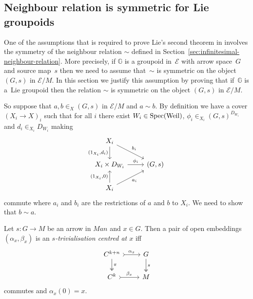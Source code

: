 \documentclass[pdftex]{sigma}
\numberwithin{equation}{section}
\begin{document}
\subsection{Neighbour relation is symmetric for Lie groupoids}\label{sec:symmetry-of-neigbour-relation}

One of the assumptions that is required to prove Lie's second theorem in \cite{burke-relative-to-local-models} involves the symmetry of the neighbour relation $\sim$ def\/ined in Section~\ref{sec:infinitesimal-neighbour-relation}. More precisely, if $\mathbb{G}$ is a groupoid in~$\mathcal{E}$ with arrow space~$G$ and source map~$s$ then we need to assume that~$\sim$ is symmetric on the object~$(G,s)$ in $\mathcal{E}/M$. In this section we justify this assumption by proving that if~$\mathbb{G}$ is a~Lie groupoid then the relation $\sim$ is symmetric on the object $(G,s)$ in $\mathcal{E}/M$.

So suppose that $a,b\in_X(G,s)$ in $\mathcal{E}/M$ and $a\sim b$. By def\/inition we have a cover $(X_i \rightarrow X)_i$ such that for all $i$ there exist $W_i\in {\rm Spec}({\rm Weil})$, $\phi_i\in_{X_i}(G,s)^{D_{W_i}}$ and $d_i\in_{X_i}D_{W_i}$ making
\begin{equation*}
\begin{tikzcd}
 X_i \dar[swap]{(1_{X_i},d_i)} \drar{b_i} {}\\
 X_i\times D_{W_i} \rar{\phi_i} & (G,s)\\
 X_i \uar{(1_{X_i},0)} \urar[swap]{a_i} & {}
\end{tikzcd}
\end{equation*}
commute where $a_i$ and $b_i$ are the restrictions of $a$ and $b$ to $X_i$. We need to show that $b\sim a$.

\begin{Definition}\label{definition:s-trivialisation}
Let $s\colon G\rightarrow M$ be an arrow in $Man$ and $x\in G$. Then a pair of open embeddings $(\alpha_{x},\beta_{x})$ is an \emph{$s$-trivialisation centred at $x$} if\/f
\begin{equation*}\begin{tikzcd}
C^{k+n} \dar[twoheadrightarrow]{\pi} \rar[rightarrowtail]{\alpha_{x}} & G \dar[twoheadrightarrow]{s} \\
C^{k} \rar[rightarrowtail]{\beta_{x}} & M
\end{tikzcd}\end{equation*}
commutes and $\alpha_{x}(0)=x$.
\end{Definition}
\end{document}

